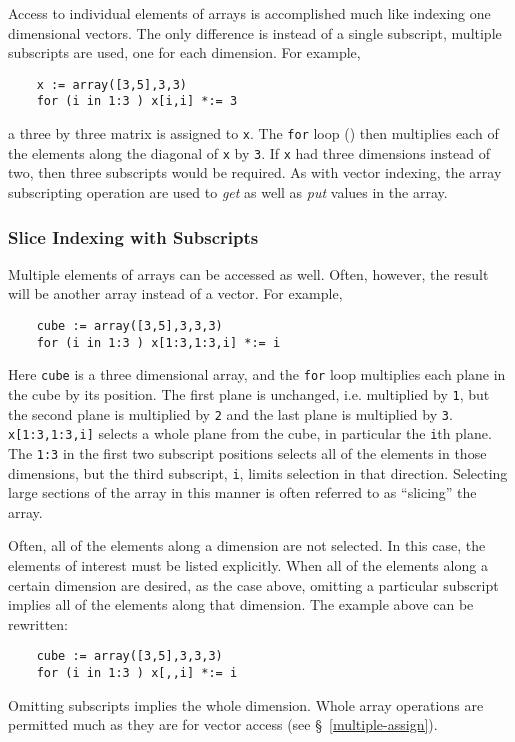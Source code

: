 Access to individual elements
of arrays is accomplished much like indexing one dimensional vectors. The only
difference is instead of a single subscript, multiple subscripts are
used, one for each dimension. For example,
\begin{verbatim}
    x := array([3,5],3,3)
    for (i in 1:3 ) x[i,i] *:= 3
\end{verbatim}
a three by three matrix is assigned to {\tt x}. The {\tt for} 
loop () then multiplies each
of the elements along the diagonal of {\tt x} by {\tt 3}. If {\tt x} had three
dimensions instead of two, then three subscripts would be required. As with
vector indexing, the array subscripting operation are used to {\em get} as well
as {\em put} values in the array.

\subsubsection{Slice Indexing with Subscripts}
\label{indexing-array-slices-subscript}

Multiple elements of arrays
can be accessed as well. Often, however, the result will be another array
instead of a vector. For example,
\begin{verbatim}
    cube := array([3,5],3,3,3)
    for (i in 1:3 ) x[1:3,1:3,i] *:= i
\end{verbatim}
Here {\tt cube} is a three dimensional array, and the {\tt for} loop 
multiplies each plane in the cube by its position. The first plane is
unchanged, i.e. multiplied by {\tt 1}, but the second plane is multiplied
by {\tt 2} and the last plane is multiplied by {\tt 3}. {\tt x[1:3,1:3,i]}
selects a whole plane from the cube, in particular the {\tt i}th plane.
The {\tt 1:3} in the first two subscript positions  selects 
all of the elements
in those dimensions, but the third subscript, {\tt i}, limits selection
in that direction. Selecting large sections of the array in this manner
is often referred to as ``slicing'' the array.

Often, all of the elements along a dimension are not selected. In this
case, the elements of interest must be listed explicitly. When all of
the elements along a certain dimension are desired,
as the case above, omitting a particular subscript implies all of the
elements along that dimension. The example above can be rewritten:
\begin{verbatim}
    cube := array([3,5],3,3,3)
    for (i in 1:3 ) x[,,i] *:= i
\end{verbatim}
Omitting subscripts implies the whole dimension. Whole array operations
are permitted much as they are for vector access (see \S~\ref{multiple-assign}).

